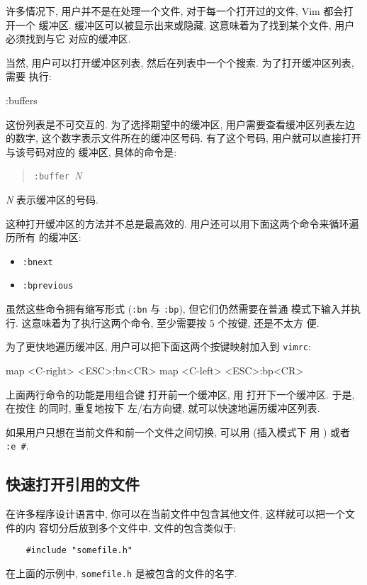 许多情况下, 用户并不是在处理一个文件, 对于每一个打开过的文件, Vim 都会打开一个
缓冲区. 缓冲区可以被显示出来或隐藏, 这意味着为了找到某个文件, 用户必须找到与它
对应的缓冲区.

当然, 用户可以打开缓冲区列表, 然后在列表中一个个搜索. 为了打开缓冲区列表, 需要 
执行:
\begin{vimcmd}
:buffers
\end{vimcmd}

这份列表是不可交互的. 为了选择期望中的缓冲区, 用户需要查看缓冲区列表左边的数字,
这个数字表示文件所在的缓冲区号码. 有了这个号码, 用户就可以直接打开与该号码对应的
缓冲区, 具体的命令是:
\begin{quotation}
\texttt{:buffer }\textit{N}
\end{quotation}
\textit{N} 表示缓冲区的号码.

这种打开缓冲区的方法并不总是最高效的. 用户还可以用下面这两个命令来循环遍历所有
的缓冲区:
\begin{itemize}
    \item \texttt{:bnext}
    \item \texttt{:bprevious}
\end{itemize}

虽然这些命令拥有缩写形式 (\texttt{:bn} 与 \texttt{:bp}), 但它们仍然需要在普通
模式下输入并执行. 这意味着为了执行这两个命令, 至少需要按 5 个按键, 还是不太方
便.

为了更快地遍历缓冲区, 用户可以把下面这两个按键映射加入到 \texttt{vimrc}:
\begin{vimcmd}
map <C-right> <ESC>:bn<CR>
map <C-left> <ESC>:bp<CR>
\end{vimcmd}
上面两行命令的功能是用组合键  打开前一个缓冲区, 用
 打开下一个缓冲区. 于是, 在按住  的同时, 重复地按下
左/右方向键, 就可以快速地遍历缓冲区列表.

\begin{warning}
    如果用户只想在当前文件和前一个文件之间切换, 可以用  (插入模式下
    用  ) 或者 \texttt{:e \#}.
\end{warning}

\subsection{快速打开引用的文件}
\label{subsec:open_referenced_files_faster}

在许多程序设计语言中, 你可以在当前文件中包含其他文件, 这样就可以把一个文件的内
容切分后放到多个文件中. 文件的包含类似于:
\begin{verbatim}
    #include "somefile.h"
\end{verbatim}
在上面的示例中, \texttt{somefile.h} 是被包含的文件的名字.

